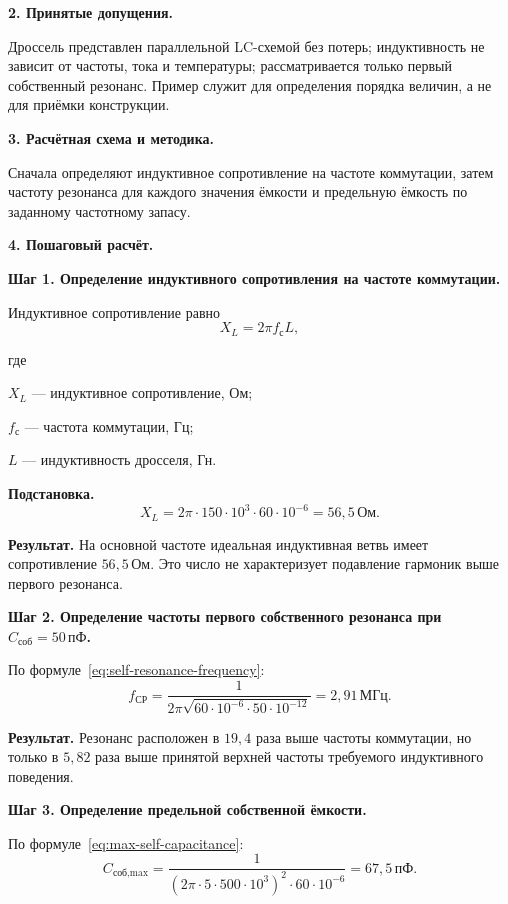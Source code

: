 \documentclass[14pt,a4paper]{extarticle}
\newcommand{\subst}{\par\noindent\textbf{Подстановка.} }
\newcommand{\result}{\par\noindent\textbf{Результат.} }
\newenvironment{whereblock}
 {\par\noindent где\par
  \begin{list}{}{\setlength{\leftmargin}{12.5mm}
                  \setlength{\itemindent}{-12.5mm}
                  \setlength{\itemsep}{0pt}
                  \setlength{\parsep}{0pt}
                  \setlength{\topsep}{0pt}}}
 {\end{list}}
\newcommand{\whereitem}[2]{\item[] #1 --- #2}
\begin{document}
\textbf{2. Принятые допущения.}

Дроссель представлен параллельной LC-схемой без потерь; индуктивность не
зависит от частоты, тока и температуры; рассматривается только первый
собственный резонанс. Пример служит для определения порядка величин, а не для
приёмки конструкции.

\textbf{3. Расчётная схема и методика.}

Сначала определяют индуктивное сопротивление на частоте коммутации, затем
частоту резонанса для каждого значения ёмкости и предельную ёмкость по
заданному частотному запасу.

\textbf{4. Пошаговый расчёт.}

\textbf{Шаг 1. Определение индуктивного сопротивления на частоте
коммутации.}

Индуктивное сопротивление равно
\begin{equation}
 X_L=2\pi f_{\text{с}}L,
 \label{eq:example-inductive-reactance}
\end{equation}
\begin{whereblock}
\whereitem{$X_L$}{индуктивное сопротивление, Ом;}
\whereitem{$f_{\text{с}}$}{частота коммутации, Гц;}
\whereitem{$L$}{индуктивность дросселя, Гн.}
\end{whereblock}

\subst
\begin{equation}
 X_L=2\pi\cdot150\cdot10^3\cdot60\cdot10^{-6}
 =56{,}5\,\text{Ом}.
\end{equation}

\result На основной частоте идеальная индуктивная ветвь имеет сопротивление
$56{,}5\,\text{Ом}$. Это число не характеризует подавление гармоник выше
первого резонанса.

\textbf{Шаг 2. Определение частоты первого собственного резонанса при
$C_{\text{соб}}=50\,\text{пФ}$.}

По формуле~\eqref{eq:self-resonance-frequency}:
\begin{equation}
 f_{\text{СР}}=
 \frac{1}{2\pi\sqrt{60\cdot10^{-6}\cdot50\cdot10^{-12}}}
 =2{,}91\,\text{МГц}.
\end{equation}

\result Резонанс расположен в $19{,}4$ раза выше частоты коммутации, но
только в $5{,}82$ раза выше принятой верхней частоты требуемого индуктивного
поведения.

\textbf{Шаг 3. Определение предельной собственной ёмкости.}

По формуле~\eqref{eq:max-self-capacitance}:
\begin{equation}
 C_{\text{соб,max}}=
 \frac{1}{
 \left(2\pi\cdot5\cdot500\cdot10^3\right)^2
 \cdot60\cdot10^{-6}}
 =67{,}5\,\text{пФ}.
\end{equation}
\end{document}
